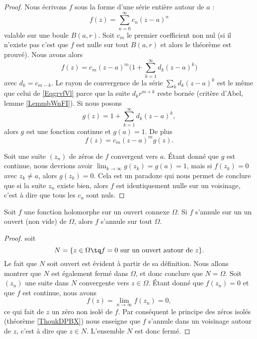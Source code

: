 \begin{proof}
    Nous écrivons \( f\) sous la forme d'une série entière autour de \( a\) :
    \begin{equation}        \label{EqgrvfVl}
        f(z)=\sum_{n=0}^{\infty}c_n(z-a)^n
    \end{equation}
    valable sur une boule \( B(a,r)\). Soit \( c_m\) le premier coefficient non nul (si il n'existe pas c'est que \( f\) est nulle sur tout \( B(a,r) \) et alors le théorème est prouvé). Nous avons alors
    \begin{equation}
        f(z)=c_m(z-a)^m\big( 1+\sum_{k=1}^{\infty}d_k(z-a)^k \big)
    \end{equation}
    avec \( d_k=c_{m-k}\). Le rayon de convergence de la série \( \sum_k d_k(z-a)^k\) est le même que celui de \eqref{EqgrvfVl} parce que la suite \( d_kr^{m+k}\) reste bornée (critère d'Abel, lemme \ref{LemmbWnFI}). Si nous posons
    \begin{equation}
        g(z)=1+\sum_{k=1}^{\infty}d_k(z-a)^k,
    \end{equation}
    alors \( g\) est une fonction continue et \( g(a)=1\). De plus 
    \begin{equation}
        f(z)=c_m(z-a)^mg(z).
    \end{equation}

    Soit une suite \( (z_n)\) de zéros de \( f\) convergent vers \( a\). Étant donné que \( g\) est continue, nous devrions avoir \( \lim_{k\to\infty}g(z_k)=g(a)=1\), mais si \( f(z_k)=0\) avec \( z_k\neq a\), alors \( g(z_k)=0\). Cela est un paradoxe qui nous permet de conclure que si la suite \( z_n\) existe bien, alors \( f\) est identiquement nulle sur un voisinage, c'est à dire que tous les \( c_n\) sont nuls.
\end{proof}

\begin{corollary}
    Soit \( f\) une fonction holomorphe sur un ouvert connexe \( \Omega\). Si \( f\) s'annule sur un un ouvert (non vide) de \( \Omega\), alors \( f\) s'annule sur tout \( \Omega\).
\end{corollary}

\begin{proof}
    soit 
    \begin{equation}
        N=\{ z\in \Omega\tq f=0\text{ sur un ouvert autour de }z \}.
    \end{equation}
    Le fait que \( N\) soit ouvert est évident à partir de sa définition. Nous allons montrer que \( N\) est également fermé dans \( \Omega\), et donc conclure que \( N=\Omega\). Soit \( (z_n)\) une suite dans \( N\) convergente vers \( z\in \Omega\). Étant donné que \( f(z_n)=0\) et que \( f\) est continue, nous avons
    \begin{equation}
        f(z)=\lim_{n\to \infty} f(z_n)=0,
    \end{equation}
    ce qui fait de \( z\) un zéro non isolé de \( f\). Par conséquent le principe des zéros isolés (théorème \ref{ThoukDPBX}) nous enseigne que \( f\) s'annule dans un voisinage autour de \( z\), c'est à dire que \( z\in N\). L'ensemble \( N\) est donc fermé.
\end{proof}


